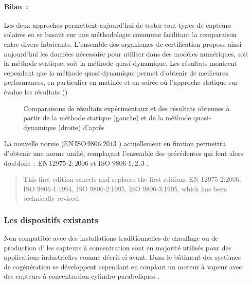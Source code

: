 \paragraph{Bilan~:} %
\label{par:bilan}
Les deux approches permettent aujourd’hui de tester tout types de capteurs solaires
en se basant sur une méthodologie commune facilitant la comparaison entre divers
fabricants. L’ensemble des organismes de certification propose ainsi aujourd’hui
les données nécessaire pour utiliser dans des modèles numériques, soit la méthode statique,
soit la méthode quasi-dynamique. Les résultats montrent cependant que la méthode quasi-dynamique
permet d’obtenir de meilleures performances, en particulier en matinée et en soirée
où l’approche statique sur-évalue les résultats ()

\begin{figure}
    \centering
    \caption{Comparaisons de résultats expérimentaux et des résultats obtenues
             à partir de la méthode statique (gauche) et de la méthode quasi-dynamique (droite)
             d’après \textcite{Zambolin201237}}
    \label{fig:compare_static_quasi_dyn}
\end{figure}

La nouvelle norme (EN\,ISO\,$9806$:$2013$ ) actuellement en finition permettra d’obtenir
une norme unifié, remplaçant l’ensemble des précédentes qui font alors doublons~:
EN\,$12975$-$2:2006$ et ISO $9806$-$1,2,3$ \parencite{ISO98062013}.
\blockquote{This first edition cancels and replaces the first editions EN 12975-2:2006,
ISO 9806-1:1994, ISO 9806-2:1995, ISO 9806-3:1995, which has been technically revised.}


\subsubsection{Les dispositifs existants} %
\label{ssub:les_dispositifs_existants}
Non compatible avec des installations traditionnelles de chauffage ou de production
d’ les capteurs à concentration sont en majorité utilisés pour des applications
industrielles comme décrit ci-avant. Dans le bâtiment des systèmes de cogénération
se développent cependant en couplant un moteur à vapeur avec des capteurs à concentration
cylindro-paraboliques .

